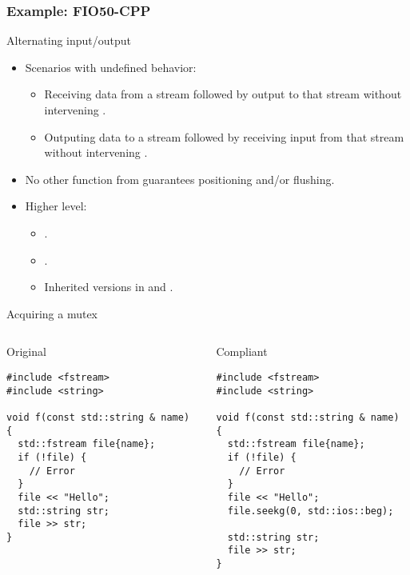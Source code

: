 \subsubsection{Example: FIO50-CPP}

\begin{frame}[t]{Alternating input/output}
\begin{itemize}
  \item Scenarios with undefined behavior:
    \begin{itemize}
      \item Receiving data from a stream followed by output to that stream
            without intervening .
      \item Outputing data to a stream followed by receiving input from that stream
            without intervening .
    \end{itemize}

  \vfill
  \item No other function from  guarantees positioning
        and/or flushing.

  \vfill
  \item Higher level:
    \begin{itemize}
      \item {}.
      \item {}.
      \item Inherited versions in  and .
    \end{itemize}
\end{itemize}
\end{frame}

\begin{frame}[t,fragile]{Acquiring a mutex}
\begin{columns}

\begin{block}{Original}
\begin{lstlisting}
#include <fstream>
#include <string>

void f(const std::string & name) {
  std::fstream file{name};
  if (!file) {
    // Error
  }
  file << "Hello";
  std::string str;
  file >> str;
}
\end{lstlisting}
\end{block}

\pause
{}
\begin{block}{Compliant}
\begin{lstlisting}[escapechar=@]
#include <fstream>
#include <string>

void f(const std::string & name) {
  std::fstream file{name};
  if (!file) {
    // Error
  }
  file << "Hello";
  file.seekg(0, std::ios::beg);

  std::string str;
  file >> str;
}
\end{lstlisting}
\end{block}

\end{columns}
\end{frame}

